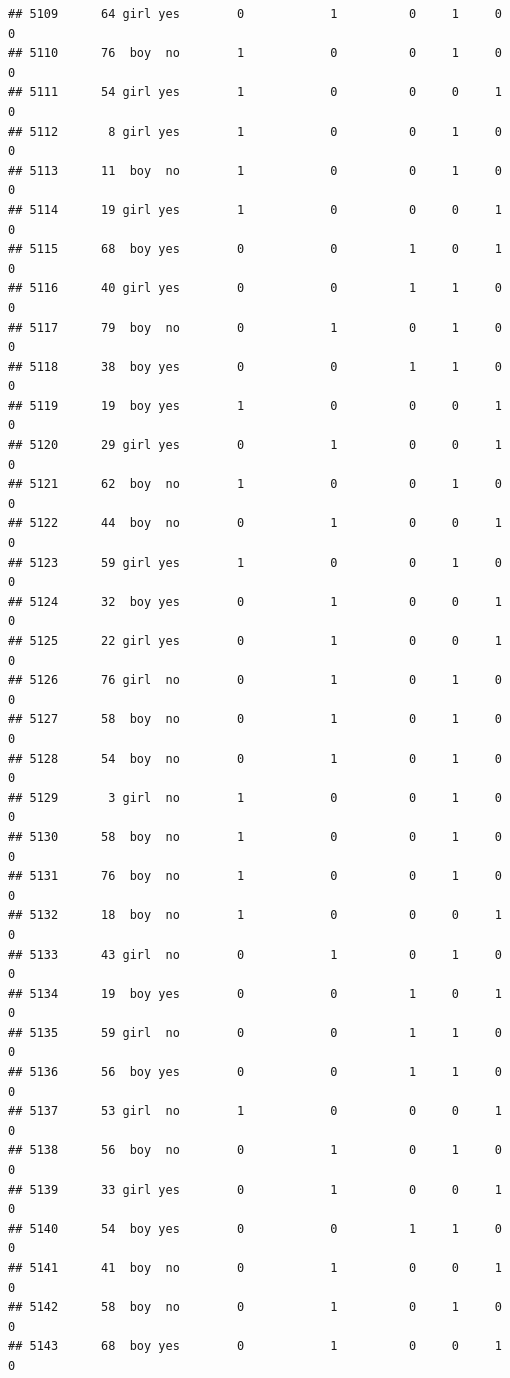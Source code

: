 \documentclass[man]{apa6}
\begin{document}
\begin{verbatim}
## 5109      64 girl yes        0            1          0     1     0     0
## 5110      76  boy  no        1            0          0     1     0     0
## 5111      54 girl yes        1            0          0     0     1     0
## 5112       8 girl yes        1            0          0     1     0     0
## 5113      11  boy  no        1            0          0     1     0     0
## 5114      19 girl yes        1            0          0     0     1     0
## 5115      68  boy yes        0            0          1     0     1     0
## 5116      40 girl yes        0            0          1     1     0     0
## 5117      79  boy  no        0            1          0     1     0     0
## 5118      38  boy yes        0            0          1     1     0     0
## 5119      19  boy yes        1            0          0     0     1     0
## 5120      29 girl yes        0            1          0     0     1     0
## 5121      62  boy  no        1            0          0     1     0     0
## 5122      44  boy  no        0            1          0     0     1     0
## 5123      59 girl yes        1            0          0     1     0     0
## 5124      32  boy yes        0            1          0     0     1     0
## 5125      22 girl yes        0            1          0     0     1     0
## 5126      76 girl  no        0            1          0     1     0     0
## 5127      58  boy  no        0            1          0     1     0     0
## 5128      54  boy  no        0            1          0     1     0     0
## 5129       3 girl  no        1            0          0     1     0     0
## 5130      58  boy  no        1            0          0     1     0     0
## 5131      76  boy  no        1            0          0     1     0     0
## 5132      18  boy  no        1            0          0     0     1     0
## 5133      43 girl  no        0            1          0     1     0     0
## 5134      19  boy yes        0            0          1     0     1     0
## 5135      59 girl  no        0            0          1     1     0     0
## 5136      56  boy yes        0            0          1     1     0     0
## 5137      53 girl  no        1            0          0     0     1     0
## 5138      56  boy  no        0            1          0     1     0     0
## 5139      33 girl yes        0            1          0     0     1     0
## 5140      54  boy yes        0            0          1     1     0     0
## 5141      41  boy  no        0            1          0     0     1     0
## 5142      58  boy  no        0            1          0     1     0     0
## 5143      68  boy yes        0            1          0     0     1     0

\end{verbatim}
\end{document}
